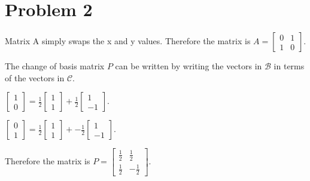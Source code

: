 \section{Problem 2}

Matrix A simply swaps the x and y values.
Therefore the matrix is
$A=
\begin{bmatrix}
    0 & 1\\
    1 & 0
\end{bmatrix}$.\gap

The change of basis matrix $P$ can be written
by writing the vectors in $\mathcal{B}$ 
in terms of the vectors in $\mathcal{C}$.\gap

$\begin{bmatrix} 1 \\ 0 \end{bmatrix} =
\frac{1}{2} \begin{bmatrix} 1 \\ 1 \end{bmatrix} +
\frac{1}{2} \begin{bmatrix} 1 \\ -1 \end{bmatrix}$.\gap

$\begin{bmatrix} 0 \\ 1 \end{bmatrix} =
\frac{1}{2} \begin{bmatrix} 1 \\ 1 \end{bmatrix} +
-\frac{1}{2} \begin{bmatrix} 1 \\ -1 \end{bmatrix}$.\gap

Therefore the matrix is
$P=
\begin{bmatrix}
    \frac{1}{2} & \frac{1}{2}\\
    \frac{1}{2} & -\frac{1}{2}
\end{bmatrix}$.
